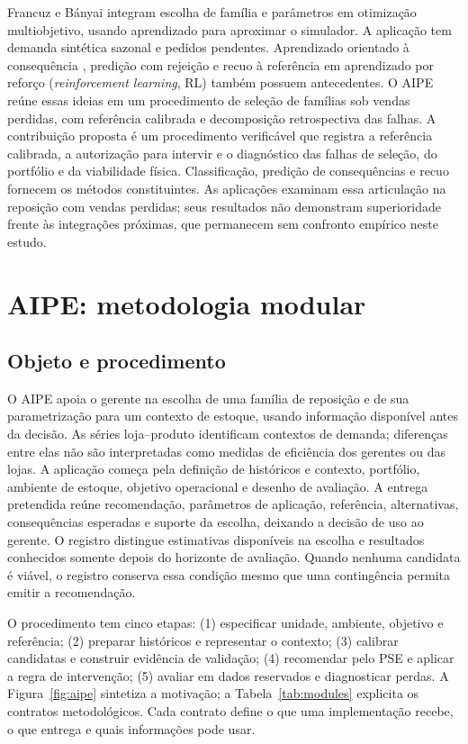 \documentclass[preprint,12pt]{elsarticle}
\begin{document}
Francuz e Bányai \cite{FrancuzBanyai2026Selection} integram escolha de família e parâmetros em otimização multiobjetivo, usando aprendizado para aproximar o simulador. A aplicação tem demanda sintética sazonal e pedidos pendentes. Aprendizado orientado à consequência \cite{ElmachtoubGrigas2022SPO}, predição com rejeição \cite{GeifmanElYaniv2019SelectiveNet} e recuo à referência em aprendizado por reforço (\textit{reinforcement learning}, RL) \cite{Laroche2019SPIBB} também possuem antecedentes. O AIPE reúne essas ideias em um procedimento de seleção de famílias sob vendas perdidas, com referência calibrada e decomposição retrospectiva das falhas. A contribuição proposta é um procedimento verificável que registra a referência calibrada, a autorização para intervir e o diagnóstico das falhas de seleção, do portfólio e da viabilidade física. Classificação, predição de consequências e recuo fornecem os métodos constituintes. As aplicações examinam essa articulação na reposição com vendas perdidas; seus resultados não demonstram superioridade frente às integrações próximas, que permanecem sem confronto empírico neste estudo.

\section{AIPE: metodologia modular}
\subsection{Objeto e procedimento}
O AIPE apoia o gerente na escolha de uma família de reposição e de sua parametrização para um contexto de estoque, usando informação disponível antes da decisão. As séries loja--produto identificam contextos de demanda; diferenças entre elas não são interpretadas como medidas de eficiência dos gerentes ou das lojas. A aplicação começa pela definição de históricos e contexto, portfólio, ambiente de estoque, objetivo operacional e desenho de avaliação. A entrega pretendida reúne recomendação, parâmetros de aplicação, referência, alternativas, consequências esperadas e suporte da escolha, deixando a decisão de uso ao gerente. O registro distingue estimativas disponíveis na escolha e resultados conhecidos somente depois do horizonte de avaliação. Quando nenhuma candidata é viável, o registro conserva essa condição mesmo que uma contingência permita emitir a recomendação.

O procedimento tem cinco etapas: (1) especificar unidade, ambiente, objetivo e referência; (2) preparar históricos e representar o contexto; (3) calibrar candidatas e construir evidência de validação; (4) recomendar pelo PSE e aplicar a regra de intervenção; (5) avaliar em dados reservados e diagnosticar perdas. A Figura~\ref{fig:aipe} sintetiza a motivação; a Tabela~\ref{tab:modules} explicita os contratos metodológicos. Cada contrato define o que uma implementação recebe, o que entrega e quais informações pode usar.
\end{document}
